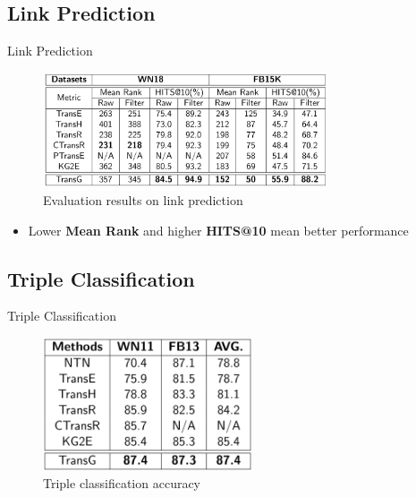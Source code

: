 \documentclass[xcolor={x11names,svgnames,dvipsnames},trans]{beamer}
\begin{document}
\subsection{Link Prediction}
\begin{frame}{Link Prediction}


    \begin{figure}[H]
        {\centering
        \includegraphics[width=0.75\textwidth]{images/link.png}\par
        }
    \caption{Evaluation results on link prediction}
    \end{figure}

    \begin{itemize}
        \item Lower \textbf{Mean Rank} and higher \textbf{HITS@10} mean better performance
    \end{itemize}

\end{frame}

\subsection{Triple Classification}
\begin{frame}{Triple Classification}

    \begin{figure}[H]
        {\centering
        \includegraphics[width=0.55\textwidth]{images/triple.png}\par
        }
        \caption{Triple classification accuracy}
    \end{figure}

\end{frame}
\end{document}
